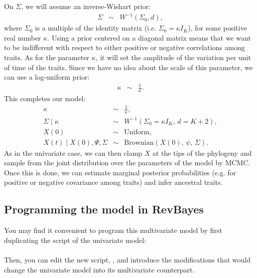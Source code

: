 On $\Sigma$, we will assume an inverse-Wishart prior:
\begin{eqnarray*}
\Sigma &\sim& W^{-1}(\Sigma_0, d),
\end{eqnarray*}
where $\Sigma_0$ is a multiple of the identity matrix (i.e. $\Sigma_0 = \kappa I_K$), for some positive real number $\kappa$.
Using a prior centered on a diagonal matrix means that we want to be indifferent with respect to either positive or negative correlations among traits. As for the parameter $\kappa$, it will set the amplitude of the variation per unit of time of the traits. Since we have no idea about the scale of this parameter, we can use a log-uniform prior:
\begin{eqnarray*}
\kappa &\sim& \frac{1}{\kappa}.
\end{eqnarray*}
This completes our model:
\begin{eqnarray*}
\kappa &\sim& \frac{1}{\kappa},
\\
\Sigma \mid \kappa &\sim& W^{-1}(\Sigma_0 = \kappa I_K , \, d = K+2),
\\
X(0) &\sim& \text{Uniform},
\\
X(t) \mid X(0), \Psi, \Sigma &\sim& \text{Brownian}(X(0), \, \psi, \, \Sigma).
\end{eqnarray*}
As in the univariate case, we can then clamp $X$ at the tips of the phylogeny and sample from the joint distribution over the parameters of the model by MCMC.
Once this is done, we can estimate marginal posterior probabilities (e.g. for positive or negative covariance among traits) and infer ancestral traits.

\subsection*{Programming the model in RevBayes}

You may find it convenient to program this multivariate model by first duplicating the script of the univariate model:
\\
\\
Then, you can edit the new script, , and introduce the modifications that would change the univariate model
into its multivariate counterpart.

